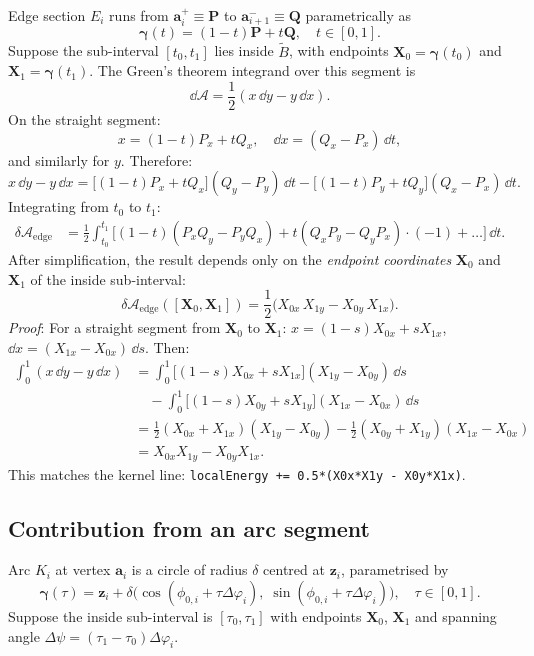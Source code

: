 \documentclass[12pt]{article}
\begin{document}
Edge section $E_i$ runs from $\mathbf{a}_i^+ \equiv \mathbf{P}$ to
$\mathbf{a}_{i+1}^- \equiv \mathbf{Q}$ parametrically as
\[
  \boldsymbol{\gamma}(t) = (1-t)\mathbf{P} + t\mathbf{Q}, \quad t \in [0,1].
\]
Suppose the sub-interval $[t_0, t_1]$ lies inside $\tilde B$, with endpoints
$\mathbf{X}_0 = \boldsymbol{\gamma}(t_0)$ and $\mathbf{X}_1 = \boldsymbol{\gamma}(t_1)$.
The Green's theorem integrand over this segment is
\[
  \dd\mathcal{A} = \frac{1}{2}(x\,\dd y - y\,\dd x).
\]
On the straight segment:
\[
  x = (1-t)P_x + tQ_x, \quad \dd x = (Q_x - P_x)\,\dd t,
\]
and similarly for $y$.  Therefore:
\[
  x\,\dd y - y\,\dd x = \bigl[(1-t)P_x + tQ_x\bigr](Q_y - P_y)\,\dd t
                       - \bigl[(1-t)P_y + tQ_y\bigr](Q_x - P_x)\,\dd t.
\]
Integrating from $t_0$ to $t_1$:
\begin{align*}
  \delta\mathcal{A}_{\mathrm{edge}} &= \frac{1}{2}\int_{t_0}^{t_1}
    \bigl[(1-t)(P_x Q_y - P_y Q_x) + t(Q_x P_y - Q_y P_x) \cdot (-1)
    + \ldots\bigr]\,\dd t.
\end{align*}
After simplification, the result depends only on the \emph{endpoint coordinates}
$\mathbf{X}_0$ and $\mathbf{X}_1$ of the inside sub-interval:
\[
  \boxed{
  \delta\mathcal{A}_{\mathrm{edge}}([\mathbf{X}_0, \mathbf{X}_1])
  = \frac{1}{2}\bigl(X_{0x}\,X_{1y} - X_{0y}\,X_{1x}\bigr).
  }
\]
\emph{Proof}: For a straight segment from $\mathbf{X}_0$ to $\mathbf{X}_1$:
$x = (1-s)X_{0x} + s X_{1x}$, $\dd x = (X_{1x} - X_{0x})\,\dd s$.  Then:
\begin{align*}
  \int_0^1 (x\,\dd y - y\,\dd x) &=
  \int_0^1 \bigl[(1-s)X_{0x} + sX_{1x}\bigr](X_{1y}-X_{0y})\,\dd s \\
  &\quad - \int_0^1\bigl[(1-s)X_{0y}+sX_{1y}\bigr](X_{1x}-X_{0x})\,\dd s \\
  &= \tfrac{1}{2}(X_{0x}+X_{1x})(X_{1y}-X_{0y})
    - \tfrac{1}{2}(X_{0y}+X_{1y})(X_{1x}-X_{0x}) \\
  &= X_{0x}X_{1y} - X_{0y}X_{1x}.
\end{align*}
This matches the kernel line: \texttt{localEnergy += 0.5*(X0x*X1y - X0y*X1x)}.

\subsection{Contribution from an arc segment}
\label{sec:arc_contrib}

Arc $K_i$ at vertex $\mathbf{a}_i$ is a circle of radius $\delta$ centred at
$\mathbf{z}_i$, parametrised by
\[
  \boldsymbol{\gamma}(\tau) = \mathbf{z}_i + \delta\bigl(\cos(\phi_{0,i} + \tau\Delta\varphi_i),\;
                                         \sin(\phi_{0,i} + \tau\Delta\varphi_i)\bigr),
  \quad \tau \in [0,1].
\]
Suppose the inside sub-interval is $[\tau_0, \tau_1]$ with endpoints $\mathbf{X}_0$,
$\mathbf{X}_1$ and spanning angle $\Delta\psi = (\tau_1 - \tau_0)\Delta\varphi_i$.
\end{document}

